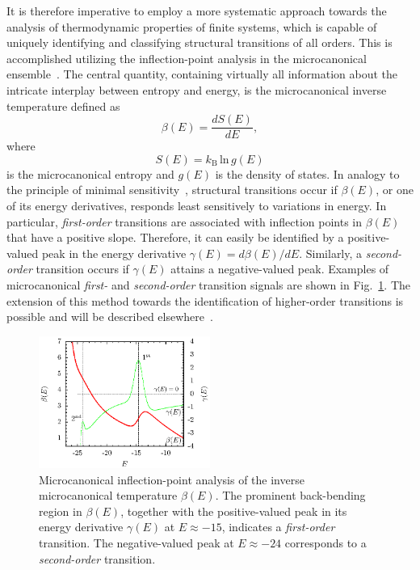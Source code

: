 \documentclass[12pt]{report}
\begin{document}
It is therefore imperative to employ a more systematic approach towards the
analysis of thermodynamic properties of finite systems, which is capable 
of uniquely identifying and classifying structural transitions of
all orders. 
This is accomplished utilizing the inflection-point analysis in the 
microcanonical
ensemble~\cite{Bachmann2014,Schnabel2011}. The central quantity,
containing virtually all information about the intricate interplay between 
entropy and energy, is the microcanonical inverse temperature 
defined as
\begin{equation}
\beta(E) = \frac{dS(E)}{dE},
\end{equation}
%
where
\begin{equation}
S(E) = k_\mathrm{B}\, \mathrm{ln}\, g(E)
\end{equation}
is the microcanonical entropy and $g(E)$ is the density of states. 
In analogy to the principle of minimal 
sensitivity~\cite{Stevenson},
structural transitions occur if $\beta (E)$, or one of its energy
derivatives,
responds least sensitively to variations in energy. 
In particular, \textit{first-order} transitions are associated 
with inflection points in $\beta (E)$ that have a positive slope.
Therefore, it can easily be identified by a positive-valued peak in the 
energy derivative $\gamma(E)=d\beta(E)/dE$. Similarly, a 
\textit{second-order}
transition occurs if $\gamma(E)$ attains a negative-valued peak. 
Examples of microcanonical \textit{first-} and \textit{second-order}
transition signals 
are 
shown in Fig.~\ref{fig:Fig_1}.
The extension of this method towards the identification of higher-order 
transitions is possible and will be described elsewhere~\cite{KaiQi2016}.
%
\begin{figure}
\centering
\includegraphics[width = 0.5\textwidth]{chapter7Figs/micro_example.eps}
\caption{\label{fig:Fig_1}%
Microcanonical inflection-point analysis of the
inverse microcanonical temperature $\beta(E)$. The prominent
back-bending region in $\beta(E)$, together with the positive-valued peak 
in its energy derivative $\gamma(E)$ at $E \approx -15$, indicates a 
\textit{first-order}
transition. The negative-valued peak at $E\approx -24$ corresponds
to a \textit{second-order} transition.}
\end{figure}
%
\end{document}
